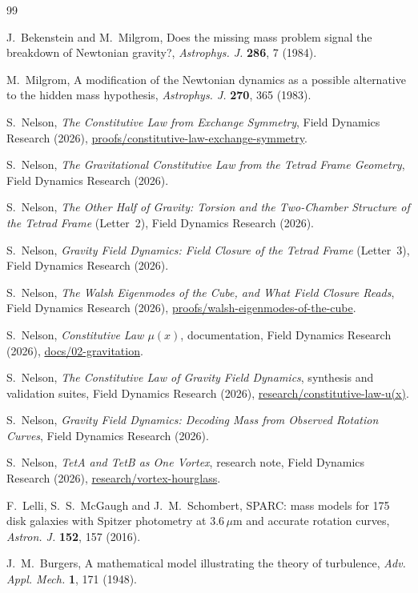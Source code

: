 \documentclass[twocolumn]{iopjournal}
\theoremstyle{definition}
\theoremstyle{remark}
\begin{document}
\begin{thebibliography}{99}

J.~Bekenstein and M.~Milgrom,
Does the missing mass problem signal the breakdown of Newtonian
gravity?, \textit{Astrophys. J.} \textbf{286}, 7 (1984).

M.~Milgrom,
A modification of the Newtonian dynamics as a possible alternative to
the hidden mass hypothesis, \textit{Astrophys. J.} \textbf{270}, 365
(1983).

S.~Nelson,
\textit{The Constitutive Law from Exchange Symmetry},
Field Dynamics Research (2026),
\url{proofs/constitutive-law-exchange-symmetry}.

S.~Nelson,
\textit{The Gravitational Constitutive Law from the Tetrad Frame
Geometry}, Field Dynamics Research (2026).

S.~Nelson,
\textit{The Other Half of Gravity: Torsion and the Two-Chamber Structure
of the Tetrad Frame} (Letter~2),
Field Dynamics Research (2026).

S.~Nelson,
\textit{Gravity Field Dynamics: Field Closure of the Tetrad Frame}
(Letter~3), Field Dynamics Research (2026).

S.~Nelson,
\textit{The Walsh Eigenmodes of the Cube, and What Field Closure Reads},
Field Dynamics Research (2026),
\url{proofs/walsh-eigenmodes-of-the-cube}.

S.~Nelson,
\textit{Constitutive Law $\mu(x)$}, documentation, Field Dynamics
Research (2026), \url{docs/02-gravitation}.

S.~Nelson,
\textit{The Constitutive Law of Gravity Field Dynamics}, synthesis and
validation suites, Field Dynamics Research (2026),
\url{research/constitutive-law-u(x)}.

S.~Nelson,
\textit{Gravity Field Dynamics: Decoding Mass from Observed Rotation
Curves},
Field Dynamics Research (2026).

S.~Nelson,
\textit{TetA and TetB as One Vortex}, research note, Field Dynamics
Research (2026), \url{research/vortex-hourglass}.

F.~Lelli, S.~S.~McGaugh and J.~M.~Schombert,
SPARC: mass models for 175 disk galaxies with Spitzer photometry at
3.6\,$\mu$m and accurate rotation curves, \textit{Astron. J.}
\textbf{152}, 157 (2016).

J.~M.~Burgers,
A mathematical model illustrating the theory of turbulence,
\textit{Adv. Appl. Mech.} \textbf{1}, 171 (1948).


\end{thebibliography}
\end{document}
